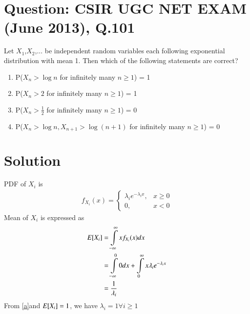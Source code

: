 \documentclass[journal,12pt,twocolumn]{IEEEtran}
\begin{document}
\section*{Question: CSIR UGC NET EXAM (June 2013), Q.101}
Let $X_1$,$X_2$,... be independent random variables each following exponential distribution with mean 1. Then which of the following statements are correct?
\begin{enumerate}
    \item P($X_n > \log n$ for infinitely many $n \geq 1$) = 1
    \item P($X_n > 2$ for infinitely many $n \geq 1$) = 1
    \item P($X_n > \frac{1}{2}$ for infinitely many $n \geq 1$) = 0
    \item P($X_n > \log n, X_{n+1}>\log (n+1)$ for infinitely many $n \geq 1$) = 0
\end{enumerate}
\section*{Solution}
\newcommand{\Integral}[2]{\ensuremath{\int\limits_{#1}^{#2}}}

PDF of $X_i$ is
\begin{align}
    f_{X_i}(x)=\begin{cases}\lambda_i e^{-\lambda_i x}, &x\geq 0\\
                0, &x<0\nonumber
    \end{cases}    
\end{align} 
Mean of $X_i$ is expressed as
\begin{align}
    \mean{X_i}&=\Integral{-\infty}{\infty}x f_{X_i}(x) dx\nonumber\\
              &=\Integral{-\infty}{0}0 dx + \Integral{0}{\infty}x \lambda_i e^{-\lambda_i x}\nonumber\\
              &=\frac{1}{\lambda_i}\label{a}
\end{align}
From \eqref{a}and $E[ X_i ]=1$, we have $\lambda_i=1 \forall  i \geq1$
\end{document}
